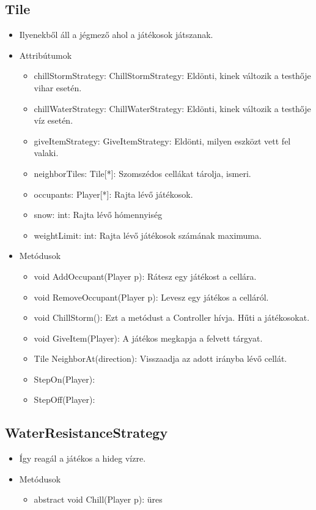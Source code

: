 \subsection{Tile}
\begin{itemize}
	\item Ilyenekből áll a jégmező ahol a játékosok játszanak.\\
\item Attribútumok
\begin{itemize}
	\item chillStormStrategy: ChillStormStrategy: Eldönti, kinek változik a testhője vihar esetén.
	\item chillWaterStrategy: ChillWaterStrategy: Eldönti, kinek változik a testhője víz esetén.
	\item giveItemStrategy: GiveItemStrategy: Eldönti, milyen eszközt vett fel valaki.
	\item neighborTiles: Tile[*]: Szomszédos cellákat tárolja, ismeri.
	\item occupants: Player[*]: Rajta lévő játékosok.
	\item snow: int: Rajta lévő hómennyiség
	\item weightLimit: int: Rajta lévő játékosok számának maximuma.
	
\end{itemize}
\item Metódusok
\begin{itemize}
	\item void AddOccupant(Player p): Rátesz egy játékost a cellára.
	\item void RemoveOccupant(Player p): Levesz egy játékos a celláról.
	\item void ChillStorm(): Ezt a metódust a Controller hívja. Hűti a játékosokat.
	\item void GiveItem(Player): A játékos megkapja a felvett tárgyat.
	\item Tile NeighborAt(direction): Visszaadja az adott irányba lévő cellát.
	\item StepOn(Player):
	\item StepOff(Player):
\end{itemize}
\end{itemize}

\subsection{WaterResistanceStrategy}
\begin{itemize}
	\item Így reagál a játékos a hideg vízre.\\
\item Metódusok
\begin{itemize}
	\item abstract void Chill(Player p): üres
\end{itemize}
\end{itemize}

